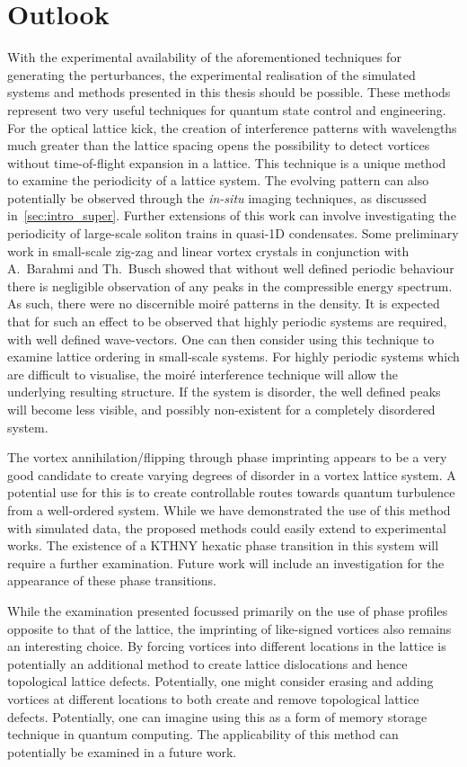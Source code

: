 \section{Outlook}


With the experimental availability of the aforementioned techniques for generating the perturbances, the experimental realisation of the simulated systems and methods presented in this thesis should be possible. These methods represent two very useful techniques for quantum state control and engineering. For the optical lattice kick, the creation of interference patterns with wavelengths much greater than the lattice spacing opens the possibility to detect vortices without time-of-flight expansion in a lattice. This technique is a unique method to examine the periodicity of a lattice system. The evolving pattern can also potentially be observed through the \textit{in-situ} imaging techniques, as discussed in~\ref{sec:intro_super}. Further extensions of this work can involve investigating the periodicity of large-scale soliton trains in quasi-1D condensates. Some preliminary work in small-scale zig-zag and linear vortex crystals in conjunction with A.~Barahmi and Th.~Busch showed that without well defined periodic behaviour there is negligible observation of any peaks in the compressible energy spectrum. As such, there were no discernible moir\'e patterns in the density. It is expected that for such an effect to be observed that highly periodic systems are required, with well defined wave-vectors. One can then consider using this technique to examine lattice ordering in small-scale systems. For highly periodic systems which are difficult to visualise, the moir\'e interference technique will allow the underlying resulting structure. If the system is disorder, the well defined peaks will become less visible, and possibly non-existent for a completely disordered system.

The vortex annihilation/flipping through phase imprinting appears to be a very good candidate to create varying degrees of disorder in a vortex lattice system. A potential use for this is to create controllable routes towards quantum turbulence from a well-ordered system. While we have demonstrated the use of this method with simulated data, the proposed methods could easily extend to experimental works. The existence of a KTHNY hexatic phase transition in this system will require a further examination. Future work will include an investigation for the appearance of these phase transitions.

While the examination presented focussed primarily on the use of phase profiles opposite to that of the lattice, the imprinting of like-signed vortices also remains an interesting choice. By forcing vortices into different locations in the lattice is potentially an additional method to create lattice dislocations and hence topological lattice defects. Potentially, one might consider erasing and adding vortices at different locations to both create and remove topological lattice defects. Potentially, one can imagine using this as a form of memory storage technique in quantum computing. The applicability of this method can potentially be examined in a future work.

